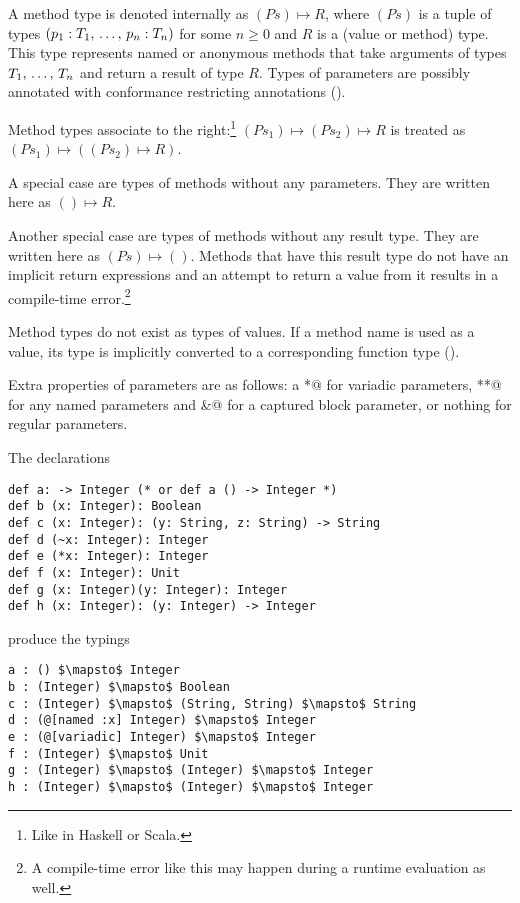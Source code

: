 A method type is denoted internally as $(Ps) \mapsto R$, where $(Ps)$ is a tuple of types  $(p_1 : T_1 ,\, \ldots ,\, p_n : T_n)$ for some $n \geq 0$ and $R$ is a (value or method) type. This type represents named or anonymous methods that take arguments of types $T_1 ,\, \ldots ,\, T_n$ and return a result of type $R$. Types of parameters are possibly annotated with conformance restricting annotations (). 

Method types associate to the right:\footnote{Like in Haskell or Scala.} \newline
$(Ps_1) \mapsto (Ps_2) \mapsto R$ is treated as $(Ps_1) \mapsto ((Ps_2) \mapsto R)$. 

A special case are types of methods without any parameters. They are written here as $() \mapsto R$. 

Another special case are types of methods without any result type. They are written here as $(Ps) \mapsto ()$. Methods that have this result type do not have an implicit return expressions and an attempt to return a value from it results in a compile-time error.\footnote{A compile-time error like this may happen during a runtime evaluation as well.}

Method types do not exist as types of values. If a method name is used as a value, its type is implicitly converted to a corresponding function type (). 

Extra properties of parameters are as follows: a \lstinline@*@ for variadic parameters, \lstinline@**@ for any named parameters and \lstinline@&@ for a captured block parameter, or nothing for regular parameters. 

\example The declarations
\begin{lstlisting}
def a: -> Integer (* or def a () -> Integer *)
def b (x: Integer): Boolean
def c (x: Integer): (y: String, z: String) -> String
def d (~x: Integer): Integer
def e (*x: Integer): Integer
def f (x: Integer): Unit
def g (x: Integer)(y: Integer): Integer
def h (x: Integer): (y: Integer) -> Integer
\end{lstlisting}
produce the typings
\begin{lstlisting}
a : () $\mapsto$ Integer
b : (Integer) $\mapsto$ Boolean
c : (Integer) $\mapsto$ (String, String) $\mapsto$ String
d : (@[named :x] Integer) $\mapsto$ Integer
e : (@[variadic] Integer) $\mapsto$ Integer
f : (Integer) $\mapsto$ Unit
g : (Integer) $\mapsto$ (Integer) $\mapsto$ Integer
h : (Integer) $\mapsto$ (Integer) $\mapsto$ Integer
\end{lstlisting}

